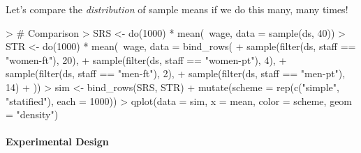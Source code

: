 \documentclass[10pt]{article}
\begin{document}
  Let's compare the \emph{distribution} of sample means if we do this many, many times!

\begin{Schunk}
\begin{Sinput}
> # Comparison
> SRS <- do(1000) * mean(~wage, data = sample(ds, 40))
> STR <- do(1000) * mean(~wage, data = bind_rows(
+                                 sample(filter(ds, staff == "women-ft"), 20),
+                                 sample(filter(ds, staff == "women-pt"), 4),
+                                 sample(filter(ds, staff == "men-ft"), 2),
+                                 sample(filter(ds, staff == "men-pt"), 14)
+ ))
> sim <- bind_rows(SRS, STR) %>%
+   mutate(scheme = rep(c("simple", "statified"), each = 1000))
> qplot(data = sim, x = mean, color = scheme, geom = "density")
\end{Sinput}
\end{Schunk}


\paragraph{Experimental Design}

\end{document}
